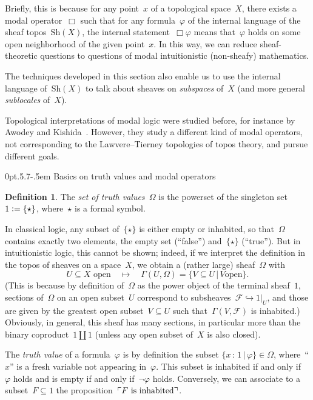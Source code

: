 \documentclass[10pt,reqno,a4paper]{amsbook}
\makeatletter
\theoremstyle{definition}
\newtheorem{defn}{Definition}[section]
\theoremstyle{plain}
\theoremstyle{remark}
\newcommand{\F}{\mathcal{F}}
\newcommand{\Sh}{\mathrm{Sh}}
\newcommand{\?}{\,{:}\,}
\renewcommand{\_}{\mathpunct{.}\,}
\newcommand{\speak}[1]{\ulcorner\text{\textnormal{#1}}\urcorner}
\newcommand{\defeq}{\vcentcolon=}
\def\subsection{\@startsection{subsection}{2}%
  {0pt}{.5\linespacing\@plus.7\linespacing}{-.5em}%
  {\normalfont\bfseries}}
\makeatother
\begin{document}
Briefly, this is because for any point~$x$ of a topological space~$X$, there
exists a modal operator~$\Box$ such that for any formula~$\varphi$ of the
internal language of the sheaf topos~$\Sh(X)$, the internal
statement~$\Box\varphi$ means that~$\varphi$ holds on some open neighborhood
of the given point~$x$. In this way, we can reduce sheaf-theoretic questions to
questions of modal intuitionistic (non-sheafy) mathematics.

The techniques developed in this section also enable us to use the internal
language of~$\Sh(X)$ to talk about sheaves on \emph{subspaces} of~$X$ (and more
general \emph{sublocales} of~$X$).

Topological interpretations of modal logic were studied before, for instance by
Awodey and Kishida~\cite{awodey-kishida:modal}. However, they study a
different kind of modal operators, not corresponding to the Lawvere--Tierney
topologies of topos theory, and pursue different goals.


\subsection{Basics on truth values and modal operators}
\label{sect:basics-on-truth-values}

\begin{defn}The \emph{set of truth values~$\Omega$} is the powerset of the
singleton set~$1 \defeq \{\star\}$, where~$\star$ is a formal symbol.\end{defn}

In classical logic, any subset of~$\{\star\}$ is either empty or inhabited, so
that~$\Omega$ contains exactly two elements, the empty set (``false'')
and~$\{\star\}$ (``true''). But
in intuitionistic logic, this cannot be shown; indeed, if we interpret the
definition in the topos of sheaves on a space~$X$, we obtain a (rather large) sheaf~$\Omega$
with
\[ \text{$U \subseteq X$ open} \quad\longmapsto\quad \Gamma(U,\Omega) = \{ V \subseteq U \,|\, \text{$V$
open} \}. \]
(This is because by definition of~$\Omega$ as the power object of the terminal
sheaf~$1$, sections of~$\Omega$ on an open subset~$U$ correspond to
subsheaves~$\F \hookrightarrow 1|_U$, and those are given by the greatest open
subset~$V \subseteq U$ such that~$\Gamma(V,\F)$ is inhabited.)
Obviously, in general, this sheaf has many sections, in particular more than
the binary coproduct~$1 \amalg 1$ (unless any open subset of~$X$ is also
closed).

The \emph{truth value} of a formula~$\varphi$ is by definition the subset
$\{ x \? 1 \,|\, \varphi \} \in \Omega$, where~``$x$'' is a fresh variable not
appearing in~$\varphi$. This subset is inhabited if and only
if~$\varphi$ holds and is empty if and only if~$\neg\varphi$ holds.
Conversely, we can associate to a subset~$F \subseteq 1$ the
proposition~$\speak{$F$ is inhabited}$.
\end{document}
